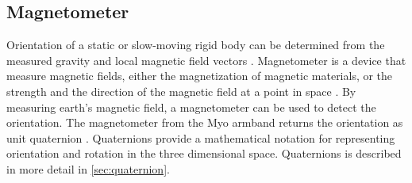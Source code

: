 \subsection{Magnetometer}
Orientation of a static or slow-moving rigid body can be determined from the measured gravity and local magnetic field vectors \cite{yun2008simplified}. Magnetometer is a device that measure magnetic fields, either the magnetization of magnetic materials, or the strength and the direction of the magnetic field at a point in space \cite{magnetometer_wiki}. By measuring earth's magnetic field, a magnetometer can be used to detect the orientation. The magnetometer from the Myo armband returns the orientation as unit quaternion \cite{myoSDK}. Quaternions provide a mathematical notation for representing orientation and rotation in the three dimensional space. Quaternions is described in more detail in \cref{sec:quaternion}.
 

